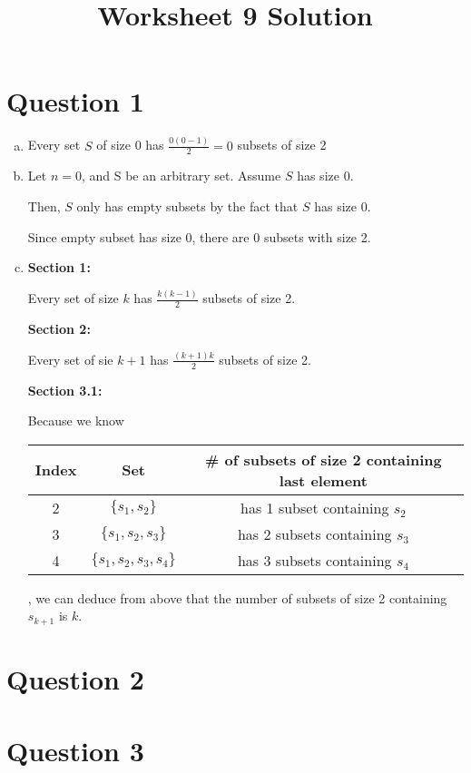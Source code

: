 \documentclass[12pt]{article}
\begin{document}
\title{Worksheet 9 Solution}
\maketitle

\section*{Question 1}
\begin{enumerate}[a.]
    \item

    Every set $S$ of size 0 has $\frac{0(0-1)}{2} = 0$ subsets of size 2

    \item

    Let $n = 0$, and S be an arbitrary set. Assume $S$ has size 0.

    \bigskip

    Then, $S$ only has empty subsets by the fact that $S$ has size 0.

    \bigskip

    Since empty subset has size 0, there are 0 subsets with size 2.

    \item

    \textbf{Section 1:}

    \bigskip

    Every set of size $k$ has $\frac{k(k-1)}{2}$ subsets of size 2.

    \bigskip

    \textbf{Section 2:}

    \bigskip

    Every set of sie $k+1$ has $\frac{(k+1)k}{2}$ subsets of size 2.

    \bigskip

    \textbf{Section 3.1:}

    \bigskip

    Because we know

    \begin{tabular}{c | c | c}
        Index & Set & \# of subsets of size 2 containing last element\\
        \hline
        2 & $\{s_1,s_2\}$ & has 1 subset containing $s_2$\\
        \hline
        3 & $\{s_1,s_2,s_3\}$ & has 2 subsets containing $s_3$\\
        \hline
        4 & $\{s_1,s_2,s_3,s_4\}$ & has 3 subsets containing $s_4$
    \end{tabular}

    \bigskip

    , we can deduce from above that the number of subsets of size 2 containing $s_{k+1}$
    is $k$.


\end{enumerate}

\section*{Question 2}

\section*{Question 3}
\end{document}
